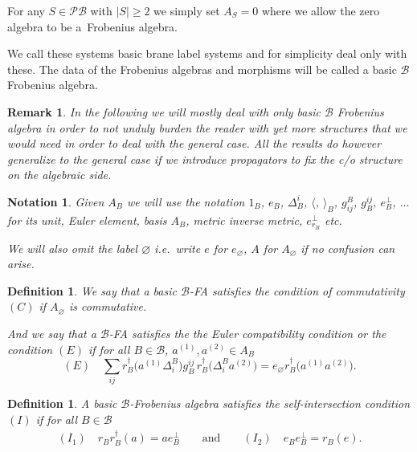 \documentclass[11pt]{article}
\newtheorem{df}[thm]{Definition}
\newtheorem{rmk}[thm]{Remark}
\newtheorem{nota}[thm]{Notation}
\def\calB{{\mathcal B}}
\def\calP{{\mathcal P}}
\def\la{\langle}
\def\ra{\rangle}
\def\res{r}
\begin{document}
For any $S\in \calP\calB$ with $|S|\geq 2$ we simply set $A_S=0$ where
we allow the zero algebra to be a~Frobenius algebra.

We call these systems basic brane label systems and for simplicity deal only with these.
The data of the Frobenius algebras and morphisms will be called a basic $\calB$ Frobenius algebra.

\begin{rmk}
In the following we will mostly deal with only basic $\calB$ Frobenius algebra in order to not unduly
burden the  reader with yet more  structures that we would need in order to deal with the general case.
All the results do however generalize to the general case if we introduce propagators to f\/ix the
c/o structure on the algebraic side.
\end{rmk}

\begin{nota}
Given $A_B$ we will use the notation
$1_B$, $e_B$, $\Delta^i_B$, $\la$, $\ra_B$, $g^B_{ij}$, $g^{ij}_B$, $e^{\perp}_B$,
$\dots$ for its unit, Euler element,
basis $A_B$, metric inverse metric, $e^{\perp}_{r_B}$ etc.

We will also omit the label ${\varnothing}$ i.e.\ write  $e$ for $e_{\varnothing}$, $A$ for $A_{\varnothing}$ if no
confusion can arise.
\end{nota}



\begin{df}
\label{Eulerdef}
We say that a basic $\calB$-FA  satisf\/ies the condition of commutativity $(C)$ if $A_{\varnothing}$ is commutative.

And we say that a $\calB$-FA satisf\/ies the
the Euler compatibility condition or the {\em condition $(E)$} if for all $B\in \calB$, $a^{(1)},a^{(2)}\in A_B$
\begin{equation*}
(E) \quad \sum_{ij}\res_B^{\dagger}\big(a^{(1)}\Delta^B_i\big) g^{ij}_B
 \,  \res_B^{\dagger}\big(\Delta^B_ia^{(2)}\big)=e_{\varnothing}\res_B^{\dagger}\big(a^{(1)}a^{(2)}\big).
\end{equation*}
\end{df}


\begin{df}
\label{selfdef}
A basic $\calB$-Frobenius algebra satisf\/ies  the {\em self-intersection} condition $(I)$
if for all $B\in \calB$
\begin{gather*}
(I_1) \quad r_{B}r^{\dagger}_{B}  (a)=  a e^{\perp}_{B} \qquad \text{and}\qquad
(I_2) \quad  e_Be^{\perp}_B =  \res_B(e).
\end{gather*}
\end{df}
\end{document}
